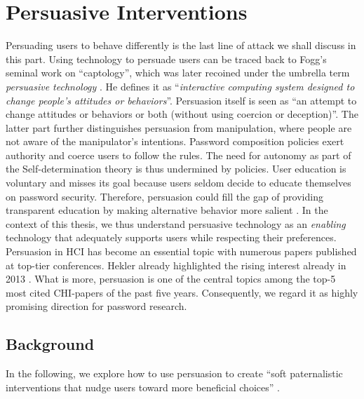 	

	\section{Persuasive Interventions}\label{sec:rw:persuasive-interventions}
	Persuading users to behave differently is the last line of attack we shall discuss in this part. Using technology to persuade users can be traced back to Fogg's seminal work on ``captology'', which was later recoined under the umbrella term \textit{persuasive technology} \cite{Fogg2002Persuasive}. He defines it as ``\textit{interactive computing system designed to change people's attitudes or behaviors}''. Persuasion itself is seen as ``an attempt to change attitudes or behaviors or both (without using coercion or deception)''. The latter part further distinguishes persuasion from manipulation, where people are not aware of the manipulator's intentions. Password composition policies exert authority and coerce users to follow the rules. The need for autonomy as part of the Self-determination theory \cite{Ryan2000SelfDeterminationTheory} is thus undermined by policies. User education is voluntary and misses its goal because users seldom decide to educate themselves on password security. Therefore, persuasion could fill the gap of providing transparent education by making alternative behavior more salient \cite{Forget2007PersuasionEducationSecurity}. In the context of this thesis, we thus understand persuasive technology as an \textit{enabling} technology that adequately supports users while respecting their preferences. Persuasion in HCI has become an essential topic with numerous papers published at top-tier conferences. Hekler already highlighted the rising interest already in 2013 \cite{Hekler2013TheoreticalGap}. What is more, persuasion is one of the central topics among the top-5 most cited CHI-papers of the past five years. Consequently, we regard it as highly promising direction for password research. 
	
	\subsection{Background}
	In the following, we explore how to use persuasion to create ``soft paternalistic interventions that nudge users toward more beneficial choices'' \cite{Acquisti2017NudgesPrivacySecurity}.
	
